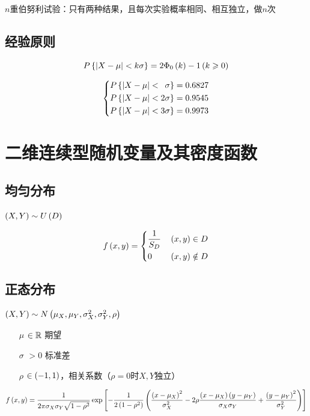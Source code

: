 \documentclass{article}
\begin{document}
$n$重伯努利试验：只有两种结果，且每次实验概率相同、相互独立，做$n$次

\subsection{经验原则}

\[P\left\{\left|X-\mu\right|<k\sigma\right\}=2\Phi_0\left(k\right)-1\left(k\geqslant0\right)\]

\[\left\{\begin{aligned}
        P\left\{\left|X-\mu\right|<\enspace\sigma\right\}=0.6827 \\
        P\left\{\left|X-\mu\right|<2\sigma\right\}=0.9545        \\
        P\left\{\left|X-\mu\right|<3\sigma\right\}=0.9973
    \end{aligned}\right.\]

\section{二维连续型随机变量及其密度函数}

\subsection{均匀分布}

$\left(X,Y\right)\sim U\left(D\right)$

\[f\left(x,y\right)=\left\{\begin{aligned}
         & \frac1{S_D} &  & \left(x,y\right)\in D    \\
         & 0           &  & \left(x,y\right)\notin D \\
    \end{aligned}\right.\]

\subsection{正态分布}

$\left(X,Y\right)\sim N\left(\mu_X,\mu_Y,\sigma_X^2,\sigma_Y^2,\rho\right)$

\begin{enumerate}
    \item [$\mu$] $\in\mathbb R$ 期望
    \item [$\sigma$] $>0$ 标准差
    \item [$\rho$] $\in\left(-1,1\right)$，相关系数（$\rho=0$时$X,Y$独立）
\end{enumerate}

\[f\left(x,y\right)=\frac1{2\pi\sigma_X\sigma_Y\sqrt{1-\rho^2}}
    \exp\left[-\frac1{2\left(1-\rho^2\right)}
        \left(\frac{{\left(x-\mu_X\right)}^2}{\sigma_X^2}
            -2\rho\frac{\left(x-\mu_X\right)\left(y-\mu_Y\right)}{\sigma_X\sigma_Y}
            +\frac{{\left(y-\mu_Y\right)}^2}{\sigma_Y^2}\right)\right]\]
\end{document}
